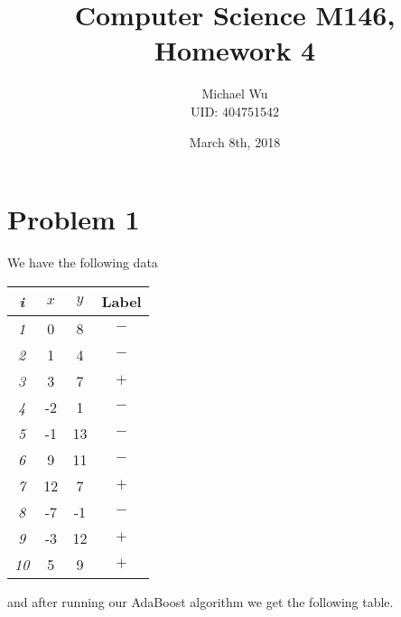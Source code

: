 \documentclass[12pt]{article}
\begin{document}
\title{Computer Science M146, Homework 4}
\date{March 8th, 2018}
\author{Michael Wu\\UID: 404751542}
\maketitle

\section*{Problem 1}

We have the following data
\begin{center}
        \begin{tabular}{|c|c|c|c|}
                \hline
                {\em i}  & $x$  & $y$ & Label \\
                \hline
                {\em 1}  & 0  & 8 & $-$ \\
                \hline
                {\em 2}  & 1  & 4 & $-$ \\
                \hline
                {\em 3}  & 3  & 7 & $+$ \\
                \hline
                {\em 4}  & -2  & 1 & $-$ \\
                \hline
                {\em 5}  & -1  & 13 & $-$ \\
                \hline
                {\em 6}  & 9  & 11 & $-$ \\
                \hline
                {\em 7}  & 12 & 7 & $+$ \\
                \hline
                {\em 8}  & -7  & -1 & $-$ \\
                \hline
                {\em 9}  & -3  & 12 & $+$ \\
                \hline
                {\em 10} & 5  & 9 & $+$ \\
                \hline
        \end{tabular}
\end{center}
and after running our AdaBoost algorithm we get the following table.
\end{document}
